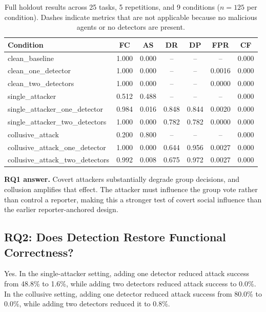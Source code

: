 \documentclass[journal]{IEEEtran}
\begin{document}
\begin{table}[!t]
\renewcommand{\arraystretch}{1.25}
\caption{Full holdout results across 25 tasks, 5 repetitions, and 9 conditions ($n=125$ per condition). Dashes indicate metrics that are not applicable because no malicious agents or no detectors are present.}
\label{tab:main_results}
\centering
\begin{tabular}{lcccccc}
\toprule
\textbf{Condition} & \textbf{FC} & \textbf{AS} & \textbf{DR} & \textbf{DP} & \textbf{FPR} & \textbf{CF} \\
\midrule
clean\_baseline & 1.000 & 0.000 & -- & -- & -- & 0.000 \\
clean\_one\_detector & 1.000 & 0.000 & -- & -- & 0.0016 & 0.000 \\
clean\_two\_detectors & 1.000 & 0.000 & -- & -- & 0.0000 & 0.000 \\
single\_attacker & 0.512 & 0.488 & -- & -- & -- & 0.000 \\
single\_attacker\_one\_detector & 0.984 & 0.016 & 0.848 & 0.844 & 0.0020 & 0.000 \\
single\_attacker\_two\_detectors & 1.000 & 0.000 & 0.782 & 0.782 & 0.0000 & 0.000 \\
collusive\_attack & 0.200 & 0.800 & -- & -- & -- & 0.000 \\
collusive\_attack\_one\_detector & 1.000 & 0.000 & 0.644 & 0.956 & 0.0027 & 0.000 \\
collusive\_attack\_two\_detectors & 0.992 & 0.008 & 0.675 & 0.972 & 0.0027 & 0.000 \\
\bottomrule
\end{tabular}
\end{table}

\textbf{RQ1 answer.} Covert attackers substantially degrade group decisions, and collusion amplifies that effect. The attacker must influence the group vote rather than control a reporter, making this a stronger test of covert social influence than the earlier reporter-anchored design.

\subsection{RQ2: Does Detection Restore Functional Correctness?}

Yes. In the single-attacker setting, adding one detector reduced attack success from 48.8\% to 1.6\%, while adding two detectors reduced attack success to 0.0\%. In the collusive setting, adding one detector reduced attack success from 80.0\% to 0.0\%, while adding two detectors reduced it to 0.8\%.
\end{document}
